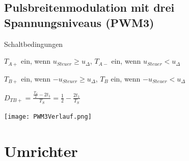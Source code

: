 \documentclass[german]{latex4ei/latex4ei_sheet}
\begin{document}
	\begin{sectionbox}
		\subsection{Pulsbreitenmodulation mit drei Spannungsniveaus (PWM3)}
		\begin{bluebox}{Schaltbedingungen}
			\item $T_{A+}$ ein, wenn $u_{Steuer} \geq u_\Delta$, $T_{A-}$ ein, wenn $u_{Steuer} < u_\Delta$
			\item $T_{B+}$ ein, wenn $-u_{Steuer} \geq u_\Delta$, $T_{B}$ ein, wenn $-u_{Steuer} < u_\Delta$
			\item $D_{TB+} = \frac{\frac{T_S}{2}-2t_1}{T_S} = \frac{1}{2}-\frac{2t_1}{T_S}$
			\item \texttt{[image: PWM3Verlauf.png]}
		\end{bluebox}	
	\end{sectionbox}
\section{Umrichter}


\end{document}
